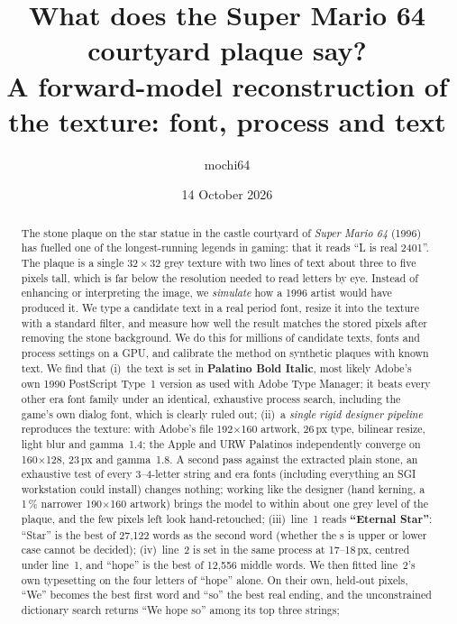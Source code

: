 \documentclass[10pt,a4paper]{article}
\title{\vspace{-1.2cm}\textbf{What does the Super Mario 64 courtyard plaque say?}\\[0.3em]
\large A forward-model reconstruction of the \q{L is real 2401} texture: font, process and text}
\author{mochi64}
\date{14 October 2026}
\newcommand{\q}[1]{``#1''}
\begin{document}
\maketitle
\thispagestyle{empty}

\begin{abstract}
\noindent The stone plaque on the star statue in the castle courtyard of \emph{Super Mario 64} (1996) has fuelled one of the longest-running
legends in gaming: that it reads \q{L is real 2401}. The plaque is a single $32{\times}32$ grey texture with two lines of
text about three to five pixels tall, which is far below the resolution needed to read letters by eye. Instead of
enhancing or interpreting the image, we \emph{simulate} how a 1996 artist would have produced it. We type a candidate
text in a real period font, resize it into the texture with a standard filter, and measure how well the result matches
the stored pixels after removing the stone background. We do this for millions of candidate texts, fonts and process
settings on a GPU, and calibrate the method on synthetic plaques with known text.
We find that
(i)~the text is set in \textbf{Palatino Bold Italic}, most likely Adobe's own 1990 PostScript Type~1 version as used
with Adobe Type Manager; it beats every
other era font family under an identical, exhaustive process search, including the game's own dialog font, which is
clearly ruled out;
(ii)~a \emph{single rigid designer pipeline} reproduces the texture: with Adobe's file 192$\times$160 artwork,
26\,px type, bilinear resize, light blur and gamma~1.4; the Apple and URW Palatinos independently converge on
160$\times$128, 23\,px and gamma~1.8. A second pass against the extracted plain stone, an exhaustive test of every
3--4-letter string and \EraN{} era fonts (including everything an SGI workstation could install) changes nothing;
working like the designer (hand kerning, a 1\,\% narrower 190$\times$160 artwork) brings the model to within about one
grey level of the plaque, and the few pixels left look hand-retouched;
(iii)~line~1 reads \textbf{\q{Eternal Star}}: \q{Star} is the best of 27{,}122 words as the second word (whether
the s is upper or lower case cannot be decided);
(iv)~line~2 is set in the same process at 17--18\,px, centred under line~1, and \q{hope} is the best of 12{,}556
middle words. We then fitted line~2's own typesetting on the four letters of \q{hope} alone. On their own, held-out
pixels, \q{We} becomes the best first word and \q{so} the best real ending, and the unconstrained dictionary search
returns \q{We hope so} among its top three strings;

\end{abstract}
\end{document}
